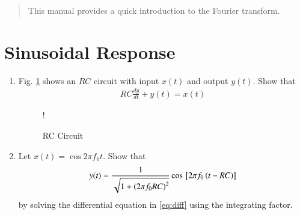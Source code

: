 \documentclass[journal,12pt,twocolumn]{IEEEtran}
\begin{document}
\tableofcontents

\bigskip

\renewcommand{\thefigure}{\theenumi}
\renewcommand{\thetable}{\theenumi}

\begin{abstract}
	This manual provides a quick introduction to the Fourier transform.
\end{abstract}
%
%
\section{Sinusoidal Response}
\begin{enumerate}[1.]
\item Fig. \ref{fig:rc} shows an $RC$ circuit with input $x(t)$ and output $y(t)$.  Show that
\begin{equation}
\label{eq:diff}
\begin{split}
RC\frac{dy}{dt} + y(t) = x(t)
\end{split}
\end{equation}
\begin{figure}[!h]
\centering
\resizebox {\columnwidth} {!} {

}
\caption{RC Circuit} 
\label{fig:rc}
\end{figure}
\item Let $x(t) = \cos 2\pi f_0 t$. Show that
\begin{equation}
y(t) = \frac{1}{\sqrt{1+\left(2\pi f_0 RC\right)^2}}\cos{}\left[2\pi f_0 \left(t - RC\right)  \right]
\end{equation}
by solving the differential equation in \eqref{eq:diff} using the integrating factor.
\begin{equation}
\begin{split}
%
\end{split}
\end{equation}
\end{enumerate}
\end{document}

